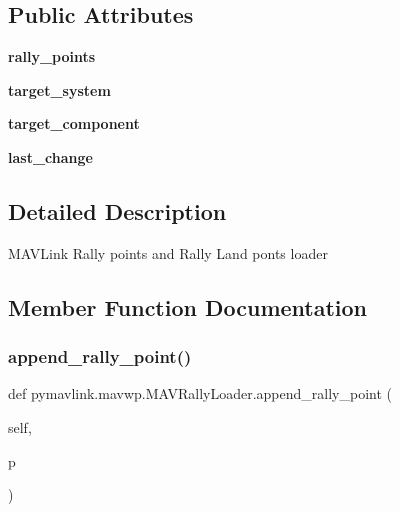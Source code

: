 \subsection*{Public Attributes}
\begin{DoxyCompactItemize}
\item 
\mbox{\label{classpymavlink_1_1mavwp_1_1MAVRallyLoader_a6d0257a0bbbf63a02933bbedeb8ba614}} 
{\bfseries rally\+\_\+points}
\item 
\mbox{\label{classpymavlink_1_1mavwp_1_1MAVRallyLoader_a48808a91e7229e6cf1825dadf630b59f}} 
{\bfseries target\+\_\+system}
\item 
\mbox{\label{classpymavlink_1_1mavwp_1_1MAVRallyLoader_af0fd1de971ba030f24d897219f4094cb}} 
{\bfseries target\+\_\+component}
\item 
\mbox{\label{classpymavlink_1_1mavwp_1_1MAVRallyLoader_a53cd4202f793f51f8f7cb23ee72920c2}} 
{\bfseries last\+\_\+change}
\end{DoxyCompactItemize}


\subsection{Detailed Description}
\begin{DoxyVerb}MAVLink Rally points and Rally Land ponts loader\end{DoxyVerb}
 

\subsection{Member Function Documentation}
\mbox{\label{classpymavlink_1_1mavwp_1_1MAVRallyLoader_a1ba9e108ed71efde9f721482f713f971}} 
\subsubsection{\texorpdfstring{append\+\_\+rally\+\_\+point()}{append\_rally\_point()}}
{\footnotesize\ttfamily def pymavlink.\+mavwp.\+M\+A\+V\+Rally\+Loader.\+append\+\_\+rally\+\_\+point (\begin{DoxyParamCaption}\item[{}]{self,  }\item[{}]{p }\end{DoxyParamCaption})}

